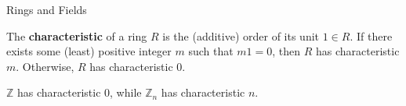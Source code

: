 \begin{section}{Rings and Fields}
\begin{defn}
The {\bf characteristic} of a ring $R$ is the (additive) order of its unit $1 \in R$. If there exists some (least) positive integer $m$ such that $m1 = 0$, then $R$ has characteristic $m$. Otherwise, $R$ has characteristic $0$.
\end{defn}

\begin{ex}
$\mathbb{Z}$ has characteristic $0$, while $\mathbb{Z}_{n}$ has characteristic $n$.
\end{ex}


\end{section}
